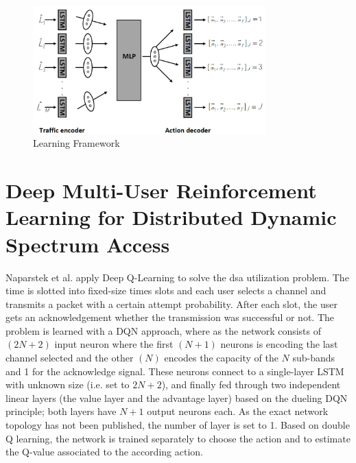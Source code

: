 \begin{figure}
    \centering
    \includegraphics[width=0.8\textwidth]{figures/challita1.png}
    \caption{Learning Framework \cite{Challita2017}}
    \label{fig:challita_mod}
\end{figure}
\fi

\section{Deep Multi-User Reinforcement Learning for Distributed Dynamic Spectrum Access \cite{Naparstek2017}}
Naparstek et al. apply Deep Q-Learning to solve the \gls{dsa} utilization problem. The time is slotted into fixed-size times slots and each user selects a channel and transmits a packet with a certain attempt probability. After each slot, the user gets an acknowledgement whether the transmission was successful or not. The problem is learned with a DQN approach, where as the network consists of $(2N+2)$ input neuron where the first $(N+1)$ neurons is encoding the last channel selected and the other $(N)$ encodes the capacity of the $N$ sub-bands and 1 for the acknowledge signal. These neurons connect to a single-layer LSTM with unknown size (i.e. set to $2N+2$), and finally fed through two independent linear layers (the value layer and the advantage layer) based on the dueling DQN principle; both layers have $N+1$ output neurons each. As the exact network topology has not been published, the number of layer is set to 1. Based on double Q learning, the network is trained separately to choose the action and to estimate the Q-value associated to the according action.


